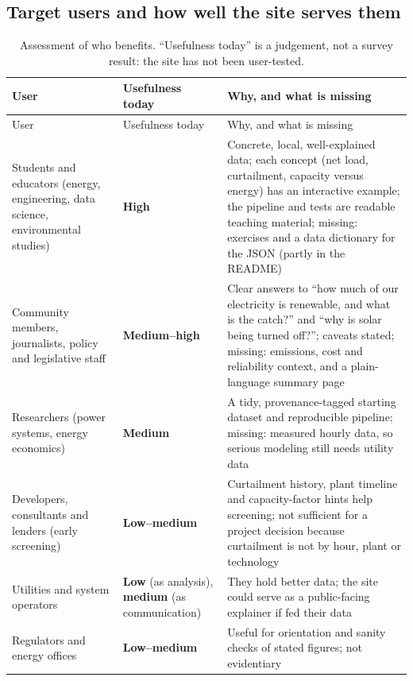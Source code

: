 \documentclass[11pt,a4paper]{article}
\begin{document}
\subsection{Target users and how well the site serves them}
{\footnotesize\setlength{\tabcolsep}{4pt}
\begin{longtable}{@{}>{\raggedright\arraybackslash}p{3.2cm}>{\raggedright\arraybackslash}p{2.2cm}>{\raggedright\arraybackslash}p{9.9cm}@{}}
\caption{Assessment of who benefits. ``Usefulness today'' is a judgement, not a survey result: the site has not
been user-tested.}\\
\toprule
User & Usefulness today & Why, and what is missing \\
\midrule
\endfirsthead
\toprule
User & Usefulness today & Why, and what is missing \\
\midrule
\endhead
\bottomrule
\endfoot
\bottomrule
\endlastfoot
Students and educators (energy, engineering, data science, environmental studies) & \textbf{High} &
 Concrete, local, well-explained data; each concept (net load, curtailment, capacity versus energy) has an
 interactive example; the pipeline and tests are readable teaching material; missing: exercises and a
 data dictionary for the JSON (partly in the README) \\
\addlinespace
Community members, journalists, policy and legislative staff & \textbf{Medium--high} &
 Clear answers to ``how much of our electricity is renewable, and what is the catch?'' and ``why is solar being turned
 off?''; caveats stated; missing: emissions, cost and reliability context, and a plain-language summary page \\
\addlinespace
Researchers (power systems, energy economics) & \textbf{Medium} &
 A tidy, provenance-tagged starting dataset and reproducible pipeline; missing: measured hourly data, so serious
 modeling still needs utility data \\
\addlinespace
Developers, consultants and lenders (early screening) & \textbf{Low--medium} &
 Curtailment history, plant timeline and capacity-factor hints help screening; not sufficient for a project decision
 because curtailment is not by hour, plant or technology \\
\addlinespace
Utilities and system operators & \textbf{Low} (as analysis), \textbf{medium} (as communication) &
 They hold better data; the site could serve as a public-facing explainer if fed their data \\
\addlinespace
Regulators and energy offices & \textbf{Low--medium} &
 Useful for orientation and sanity checks of stated figures; not evidentiary \\
\end{longtable}}
\end{document}
